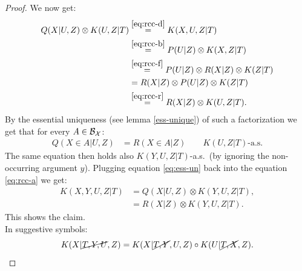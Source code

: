 \begin{Lem}
\begin{proof}
    We now get:
    \begin{align}
        Q(X|U,Z) \otimes K(U,Z|T) 
        & \stackrel{\ref{eq:rcc-d}}{=}  K(X,U,Z|T) \\
        & \stackrel{\ref{eq:rcc-b}}{=} P(U|Z) \otimes K(X,Z|T) \\
        &\stackrel{\ref{eq:rcc-f}}{=} P(U|Z) \otimes R(X|Z) \otimes K(Z|T) \\
        &=  R(X|Z)  \otimes P(U|Z) \otimes K(Z|T) \\
        &\stackrel{\ref{eq:rcc-r}}{=} R(X|Z)  \otimes  K(U,Z|T).
    \end{align}
    By the essential uniqueness (see lemma \ref{ess-unique}) of such a factorization we get that for every $A \in \mathcal{B}_{\mathcal{X}}$:
    \begin{align}
        Q(X \in A|U,Z) &= R(X \in A|Z) \qquad K(U,Z|T)\text{-a.s.}  \label{eq:ess-un}
    \end{align}
The same equation then holds also $K(Y,U,Z|T)$-a.s.\ (by ignoring the non-occurring argument $y$).
Plugging equation \ref{eq:ess-un} back into the equation \ref{eq:rcc-a} we get:
    \begin{align}
        K(X,Y,U,Z|T) & = Q(X|U,Z) \otimes K(Y,U,Z|T),\\
                     & = R(X|Z)  \otimes K(Y,U,Z|T).
    \end{align}
This shows the claim.\\
In suggestive symbols:
\[ K(X|\cancel{T,Y,U},Z) = K(X|\cancel{T,Y},U,Z) \circ K(U|\cancel{T,X},Z).\]
\end{proof}
\end{Lem}


